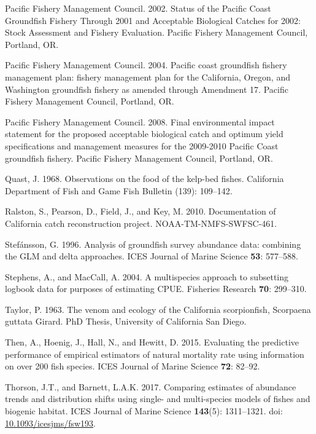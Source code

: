 \documentclass[12pt,]{article}
\begin{document}
\hypertarget{ref-PFMC2002}{}
Pacific Fishery Management Council. 2002. Status of the Pacific Coast
Groundfish Fishery Through 2001 and Acceptable Biological Catches for
2002: Stock Assessment and Fishery Evaluation. Pacific Fishery
Management Council, Portland, OR.

\hypertarget{ref-PFMC2004}{}
Pacific Fishery Management Council. 2004. Pacific coast groundfish
fishery management plan: fishery management plan for the California,
Oregon, and Washington groundfish fishery as amended through Amendment
17. Pacific Fishery Management Council, Portland, OR.

\hypertarget{ref-PFMC2008}{}
Pacific Fishery Management Council. 2008. Final environmental impact
statement for the proposed acceptable biological catch and optimum yield
specifications and management measures for the 2009-2010 Pacific Coast
groundfish fishery. Pacific Fishery Management Council, Portland, OR.

\hypertarget{ref-Quast1968}{}
Quast, J. 1968. Observations on the food of the kelp-bed fishes.
California Department of Fish and Game Fish Bulletin (139): 109--142.

\hypertarget{ref-Ralston2010}{}
Ralston, S., Pearson, D., Field, J., and Key, M. 2010. Documentation of
California catch reconstruction project. NOAA-TM-NMFS-SWFSC-461.

\hypertarget{ref-Stefansson1996}{}
Stefánsson, G. 1996. Analysis of groundfish survey abundance data:
combining the GLM and delta approaches. ICES Journal of Marine Science
\textbf{53}: 577--588.

\hypertarget{ref-Stephens2004}{}
Stephens, A., and MacCall, A. 2004. A multispecies approach to
subsetting logbook data for purposes of estimating CPUE. Fisheries
Research \textbf{70}: 299--310.

\hypertarget{ref-Taylor1963}{}
Taylor, P. 1963. The venom and ecology of the California scorpionfish,
Scorpaena guttata Girard. PhD Thesis, University of California San
Diego.

\hypertarget{ref-Then2015}{}
Then, A., Hoenig, J., Hall, N., and Hewitt, D. 2015. Evaluating the
predictive performance of empirical estimators of natural mortality rate
using information on over 200 fish species. ICES Journal of Marine
Science \textbf{72}: 82--92.

\hypertarget{ref-Thorson2017}{}
Thorson, J.T., and Barnett, L.A.K. 2017. Comparing estimates of
abundance trends and distribution shifts using single- and multi-species
models of fishes and biogenic habitat. ICES Journal of Marine Science
\textbf{143}(5): 1311--1321. doi:
\href{https://doi.org/10.1093/icesjms/fsw193}{10.1093/icesjms/fsw193}.
\end{document}
